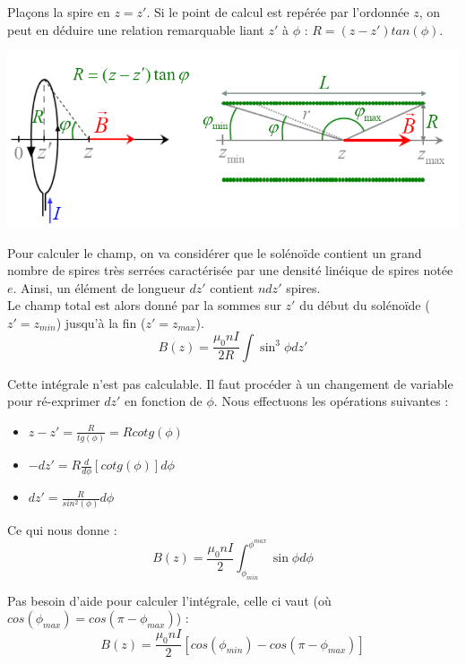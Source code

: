 \documentclass	[11pt, a4paper, openany]{book}
\begin{document}
Plaçons la spire en $z = z'$. Si le point de calcul est repérée par l'ordonnée $z$, on peut en déduire une relation remarquable liant $z'$ à $\phi$ : $R = (z - z')tan(\phi)$.

\begin{center}
\includegraphics[scale=0.70]{magneto/image11.png}
\end{center}

Pour calculer le champ, on va considérer que le solénoïde contient un grand nombre de spires très serrées caractérisée par une densité linéique de spires notée $e$. Ainsi, un élément de longueur $dz'$ contient $ndz'$ spires.\\

Le champ total est alors donné par la sommes sur $z'$ du début du solénoïde ($z' = z_{min}$) jusqu'à la fin ($z' = z_{max}$).
\begin{equation}
B(z) = \frac{\mu_0 nI}{2R}\int \sin^3\phi dz'
\end{equation}

Cette intégrale n'est pas calculable. Il faut procéder à un changement de variable pour ré-exprimer $dz'$ en fonction de $\phi$. Nous effectuons les opérations suivantes :
\begin{itemize}
\item $z - z' = \frac{R}{tg(\phi)} = Rcotg(\phi)$
\item $-dz' = R\frac{d}{d\phi}[cotg(\phi)]d\phi$
\item $dz' = \frac{R}{sin^2(\phi)}d\phi$
\end{itemize}
Ce qui nous donne :
\begin{equation}
B(z) = \frac{\mu_0 nI}{2}\int_{\phi_{min}}^{\phi^{max}} \sin\phi d\phi
\end{equation}

Pas besoin d'aide pour calculer l'intégrale, celle ci vaut (où $cos(\phi_{max}) = cos(\pi - \phi_{max})$) : 
\begin{equation}
B(z) = \frac{\mu_0 nI}{2}[cos(\phi_{min}) - cos(\pi - \phi_{max})]
\end{equation}
\end{document}
